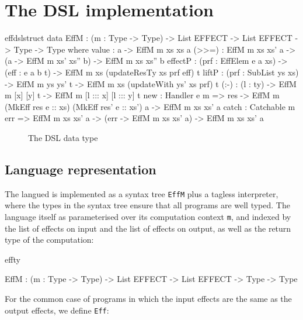 \section{The \Eff{} DSL implementation}

\label{sect:effimpl}

\begin{SaveVerbatim}{effdslstruct}
data EffM : (m : Type -> Type) -> List EFFECT -> List EFFECT -> Type -> Type where
     value   : a -> EffM m xs xs a
     (>>=)   : EffM m xs xs' a -> (a -> EffM m xs' xs'' b) -> EffM m xs xs'' b
     effectP : (prf : EffElem e a xs) -> (eff : e a b t) -> EffM m xs (updateResTy xs prf eff) t
     liftP   : (prf : SubList ys xs) -> EffM m ys ys' t -> EffM m xs (updateWith ys' xs prf) t
     (:-)    : (l : ty) -> EffM m [x] [y] t -> EffM m [l ::: x] [l ::: y] t
     new     : Handler e m => res -> EffM m (MkEff res e :: xs) (MkEff res' e :: xs') a -> EffM m xs xs' a
     catch   : Catchable m err => EffM m xs xs' a -> (err -> EffM m xs xs' a) -> EffM m xs xs' a
\end{SaveVerbatim}

\begin{figure*}[t]
\begin{center}
\end{center}
\caption{The \Eff{} DSL data type}
\label{effdsltype}
\end{figure*}

\subsection{Language representation}

The \Eff{} langued is implemented as a syntax tree \texttt{EffM}
plus a tagless interpreter, where the
types in the syntax tree ensure that all \Eff{} programs are well typed.
The language itself as parameterised over its computation context \texttt{m},
and indexed by the list of effects on input and the list of effects on output,
as well as the return type of the computation:

\begin{SaveVerbatim}{effty}

EffM : (m : Type -> Type) -> 
       List EFFECT -> List EFFECT -> Type -> Type

\end{SaveVerbatim}

\noindent
For the common case of programs in which the input effects are the same as
the output effects, we define \texttt{Eff}:

